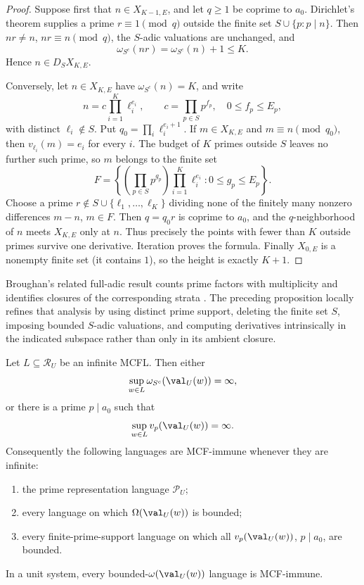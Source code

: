 \begin{proof}
  Suppose first that \(n\in X_{K-1,E}\), and let \(q\ge1\) be coprime
  to \(a_0\). Dirichlet's theorem supplies a prime
  \(r\equiv1\pmod q\) outside the finite set \(S\cup\{p:p\mid n\}\).
  Then \(nr\ne n\), \(nr\equiv n\pmod q\), the \(S\)-adic valuations
  are unchanged, and
  \[
    \omega_{S^c}(nr)=\omega_{S^c}(n)+1\le K.
  \]
  Hence \(n\in D_SX_{K,E}\).

  Conversely, let \(n\in X_{K,E}\) have
  \(\omega_{S^c}(n)=K\), and write
  \[
    n=c\prod_{i=1}^K\ell_i^{e_i},
    \qquad c=\prod_{p\in S}p^{f_p},\quad 0\le f_p\le E_p,
  \]
  with distinct \(\ell_i\notin S\). Put
  \(q_0=\prod_i\ell_i^{e_i+1}\). If \(m\in X_{K,E}\) and
  \(m\equiv n\pmod {q_0}\), then
  \(v_{\ell_i}(m)=e_i\) for every \(i\). The budget of \(K\) primes
  outside \(S\) leaves no further such prime, so \(m\) belongs to the
  finite set
  \[
    F=\left\{
      \left(\prod_{p\in S}p^{g_p}\right)
      \prod_{i=1}^K\ell_i^{e_i}:
      0\le g_p\le E_p
    \right\}.
  \]
  Choose a prime \(r\notin S\cup\{\ell_1,\ldots,\ell_K\}\) dividing
  none of the finitely many nonzero differences \(m-n\), \(m\in F\).
  Then \(q=q_0r\) is coprime to \(a_0\), and the \(q\)-neighborhood of
  \(n\) meets \(X_{K,E}\) only at \(n\). Thus precisely the points with
  fewer than \(K\) outside primes survive one derivative. Iteration
  proves the formula. Finally \(X_{0,E}\) is a nonempty finite set (it
  contains \(1\)), so the height is exactly \(K+1\).
\end{proof}

Broughan's related full-adic result counts prime factors with
multiplicity and identifies closures of the corresponding strata
\cite[Theorem~4.3]{Broughan2003}. The preceding proposition locally refines
that analysis by using distinct prime support, deleting the finite set \(S\),
imposing bounded \(S\)-adic valuations, and computing derivatives
intrinsically in the indicated subspace rather than only in its ambient
closure.

\begin{theorem}
  \label{thm:nonunit-mcfl-escape-dichotomy}
  Let \(L\subseteq\mathcal R_U\) be an infinite MCFL. Then either
  \[
    \sup_{w\in L}\omega_{S^c}(\val_U(w))=\infty,
  \]
  or there is a prime \(p\mid a_0\) such that
  \[
    \sup_{w\in L}v_p(\val_U(w))=\infty.
  \]
  Consequently the following languages are MCF-immune whenever they are
  infinite:
  \begin{enumerate}[label=\textup{(\roman*)}]
    \item the prime representation language \(\mathcal P_U\);
    \item every language on which \(\Omega(\val_U(w))\) is bounded;
    \item every finite-prime-support language on which all
    \(v_p(\val_U(w))\), \(p\mid a_0\), are bounded.
  \end{enumerate}
  In a unit system, every bounded-\(\omega(\val_U(w))\) language is
  MCF-immune.
\end{theorem}

